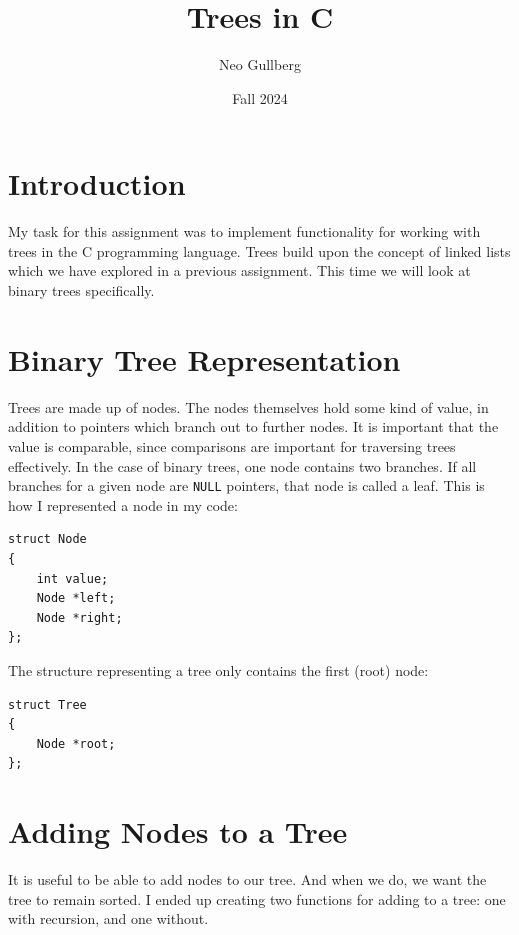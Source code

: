 \documentclass[a4paper, 11pt]{article}
\begin{document}
\title{
	\textbf{Trees in C}
}
\author{Neo Gullberg}
\date{Fall 2024}
\maketitle

\section{Introduction}
	My task for this assignment was to implement functionality for working with trees in the C programming language.
	Trees build upon the concept of linked lists which we have explored in a previous assignment.
	This time we will look at binary trees specifically.

\section{Binary Tree Representation}
	Trees are made up of nodes.
	The nodes themselves hold some kind of value, in addition to pointers which branch out to further nodes.
	It is important that the value is comparable, since comparisons are important for traversing trees effectively.
	In the case of binary trees, one node contains two branches.
	If all branches for a given node are \texttt{NULL} pointers, that node is called a leaf.
	This is how I represented a node in my code:
	\begin{verbatim}
struct Node
{
	int value;
	Node *left;
	Node *right;
};
	\end{verbatim}
	The structure representing a tree only contains the first (root) node:
	\begin{verbatim}
struct Tree
{
	Node *root;
};
	\end{verbatim}

\section{Adding Nodes to a Tree}
	It is useful to be able to add nodes to our tree.
	And when we do, we want the tree to remain sorted.
	I ended up creating two functions for adding to a tree: one with recursion, and one without.
\end{document}

